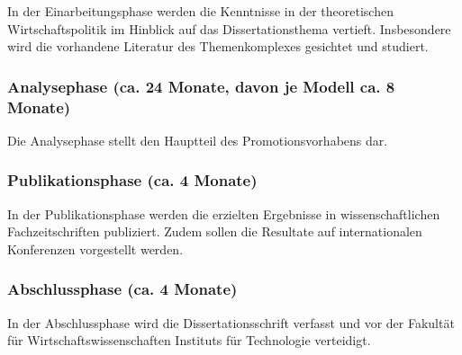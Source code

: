 \documentclass[a4paper,bibliography=totocnumbered,12pt]{article}
\begin{document}
In der Einarbeitungsphase werden die Kenntnisse in der theoretischen Wirtschaftspolitik im Hinblick auf das Dissertationsthema vertieft. Insbesondere wird die vorhandene Literatur des Themenkomplexes gesichtet und studiert.  

\subsubsection*{Analysephase (ca. 24 Monate, davon je Modell ca. 8 Monate)}

Die Analysephase stellt den Hauptteil des Promotionsvorhabens dar. 

\subsubsection*{Publikationsphase (ca. 4 Monate)}

In der Publikationsphase werden die erzielten Ergebnisse in wissenschaftlichen Fachzeitschriften publiziert. Zudem sollen die Resultate auf internationalen Konferenzen vorgestellt werden.

\subsubsection*{Abschlussphase (ca. 4 Monate)}

In der Abschlussphase wird die Dissertationsschrift verfasst und vor der Fakult\"at f\"ur Wirtschaftswissenschaften Instituts f\"ur Technologie verteidigt.

\clearpage


\renewcommand{\refname}{Literaturverzeichnis}





\end{document}
